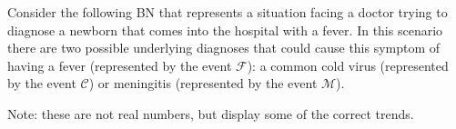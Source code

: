 \documentclass[review_Solutions]{subfiles}
\begin{document}
\begin{exercise}
Consider the following BN that represents a situation facing a doctor trying to diagnose a newborn that comes into the hospital with a fever.  In this scenario there are two possible underlying diagnoses that could cause this symptom of having a fever (represented by the event $\mathcal{F}$): a common cold virus (represented by the event $\mathcal{C}$) or meningitis (represented by the event $\mathcal{M}$).

Note: these are not real numbers, but display some of the correct trends.


\end{exercise}
\end{document}
